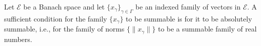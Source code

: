 Let $\mathcal{E}$ be a Banach space and let $\{x_{\gamma}\}_{\gamma \in \Gamma}$ be an indexed family of vectors in $\mathcal{E}$. A sufficient condition for the family $\{x_{\gamma}\}$ to be summable is for it to be absolutely summable, i.e., for the family of norms $\{\|x_{\gamma}\|\}$ to be a summable family of real numbers.
